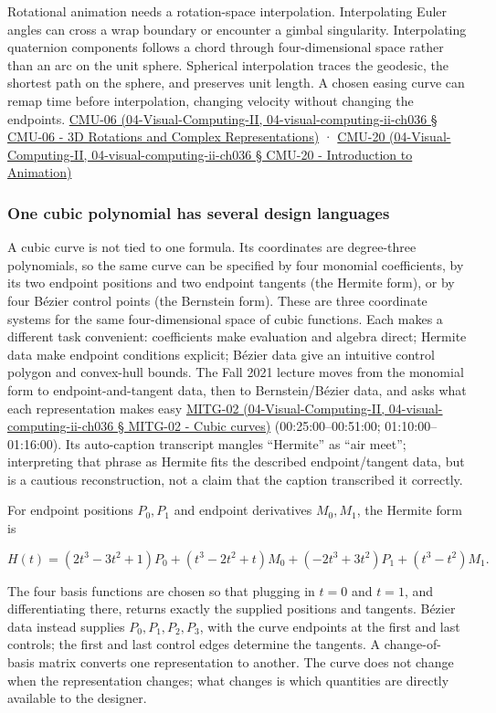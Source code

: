 Rotational animation needs a rotation-space interpolation. Interpolating Euler angles can cross a wrap boundary or encounter a gimbal singularity. Interpolating quaternion components follows a chord through four-dimensional space rather than an arc on the unit sphere. Spherical interpolation traces the geodesic, the shortest path on the sphere, and preserves unit length. A chosen easing curve can remap time before interpolation, changing velocity without changing the endpoints. \href{}{CMU-06 (04-Visual-Computing-II, 04-visual-computing-ii-ch036 § CMU-06 - 3D Rotations and Complex Representations)} · \href{}{CMU-20 (04-Visual-Computing-II, 04-visual-computing-ii-ch036 § CMU-20 - Introduction to Animation)}

\subsubsection{One cubic polynomial has several design languages}\label{one-cubic-polynomial-has-several-design-languages}

A cubic curve is not tied to one formula. Its coordinates are degree-three polynomials, so the same curve can be specified by four monomial coefficients, by its two endpoint positions and two endpoint tangents (the Hermite form), or by four Bézier control points (the Bernstein form). These are three coordinate systems for the same four-dimensional space of cubic functions. Each makes a different task convenient: coefficients make evaluation and algebra direct; Hermite data make endpoint conditions explicit; Bézier data give an intuitive control polygon and convex-hull bounds. The Fall 2021 lecture moves from the monomial form to endpoint-and-tangent data, then to Bernstein/Bézier data, and asks what each representation makes easy \href{}{MITG-02 (04-Visual-Computing-II, 04-visual-computing-ii-ch036 § MITG-02 - Cubic curves)} (00:25:00--00:51:00; 01:10:00--01:16:00). Its auto-caption transcript mangles ``Hermite'' as ``air meet''; interpreting that phrase as Hermite fits the described endpoint/tangent data, but is a cautious reconstruction, not a claim that the caption transcribed it correctly.

For endpoint positions \(P_0,P_1\) and endpoint derivatives \(M_0,M_1\), the Hermite form is

\[
H(t)=(2t^3-3t^2+1)P_0+(t^3-2t^2+t)M_0+(-2t^3+3t^2)P_1+(t^3-t^2)M_1.
\]

The four basis functions are chosen so that plugging in \(t=0\) and \(t=1\), and differentiating there, returns exactly the supplied positions and tangents. Bézier data instead supplies \(P_0,P_1,P_2,P_3\), with the curve endpoints at the first and last controls; the first and last control edges determine the tangents. A change-of-basis matrix converts one representation to another. The curve does not change when the representation changes; what changes is which quantities are directly available to the designer.

